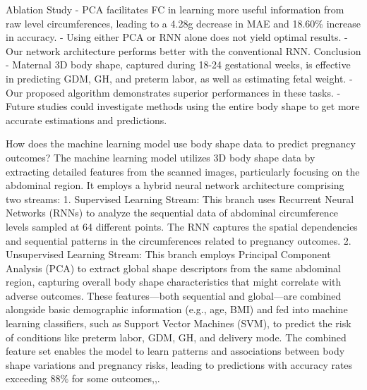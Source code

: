 \documentclass[conference, 12pt]{IEEEtran}
\begin{document}
Ablation Study
- PCA facilitates FC in learning more useful information from raw level circumferences, leading to a 4.28g decrease in MAE and 18.60\% increase in accuracy.
- Using either PCA or RNN alone does not yield optimal results.
- Our network architecture performs better with the conventional RNN.
Conclusion
- Maternal 3D body shape, captured during 18-24 gestational weeks, is effective in predicting GDM, GH, and preterm labor, as well as estimating fetal weight.
- Our proposed algorithm demonstrates superior performances in these tasks.
- Future studies could investigate methods using the entire body shape to get more accurate estimations and predictions.




How does the machine learning model use body shape data to predict pregnancy outcomes?
The machine learning model utilizes 3D body shape data by extracting detailed features from the scanned images, particularly focusing on the abdominal region. It employs a hybrid neural network architecture comprising two streams:
1. Supervised Learning Stream: This branch uses Recurrent Neural Networks (RNNs) to analyze the sequential data of abdominal circumference levels sampled at 64 different points. The RNN captures the spatial dependencies and sequential patterns in the circumferences related to pregnancy outcomes.
2. Unsupervised Learning Stream: This branch employs Principal Component Analysis (PCA) to extract global shape descriptors from the same abdominal region, capturing overall body shape characteristics that might correlate with adverse outcomes.
These features—both sequential and global—are combined alongside basic demographic information (e.g., age, BMI) and fed into machine learning classifiers, such as Support Vector Machines (SVM), to predict the risk of conditions like preterm labor, GDM, GH, and delivery mode. The combined feature set enables the model to learn patterns and associations between body shape variations and pregnancy risks, leading to predictions with accuracy rates exceeding 88\% for some outcomes,,.
\end{document}
